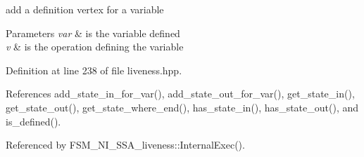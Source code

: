 add a definition vertex for a variable 


\begin{DoxyParams}{Parameters}
{\em var} & is the variable defined \\
\hline
{\em v} & is the operation defining the variable \\
\hline
\end{DoxyParams}


Definition at line 238 of file liveness.\+hpp.



References add\+\_\+state\+\_\+in\+\_\+for\+\_\+var(), add\+\_\+state\+\_\+out\+\_\+for\+\_\+var(), get\+\_\+state\+\_\+in(), get\+\_\+state\+\_\+out(), get\+\_\+state\+\_\+where\+\_\+end(), has\+\_\+state\+\_\+in(), has\+\_\+state\+\_\+out(), and is\+\_\+defined().



Referenced by F\+S\+M\+\_\+\+N\+I\+\_\+\+S\+S\+A\+\_\+liveness\+::\+Internal\+Exec().

